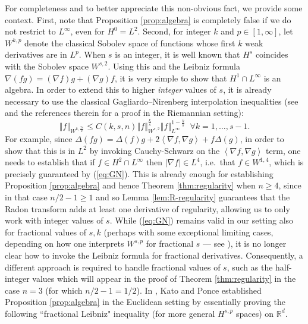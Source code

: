 \documentclass[11pt]{article}
\theoremstyle{definition}
\theoremstyle{proof}
\DeclareMathOperator{\+}{\mathop{\tilde{+}}}
\newcommand{\norm}[1]{\left\Vert#1\right\Vert}
\newcommand{\abs}[1]{\left\vert#1\right\vert}
\newcommand{\scalar}[1]{\left \langle #1 \right \rangle}
\newcommand{\R}{\mathbb{R}}
\numberwithin{equation}{section}
\numberwithin{equation}{section}
\begin{document}
For completeness and to better appreciate this non-obvious fact, we provide some context. First, note that Proposition \ref{prop:algebra} is completely false if we do not restrict to $L^\infty$, even for $H^0 = L^2$.  Second, for integer $k$ and $p \in [1,\infty]$, let $W^{k,p}$ denote the classical Sobolev space of functions whose first $k$ weak derivatives are in $L^p$. When $s$ is an integer, it is well known that $H^s$ coincides with the Sobolev space $W^{s,2}$. Using this and the Leibniz formula $\nabla( f g) = (\nabla f) g + (\nabla g) f$, it is very simple to show that $H^1 \cap L^\infty$ is an algebra. In order to extend this to higher \emph{integer} values of $s$, it is already necessary to use the classical Gagliardo--Nirenberg interpolation inequalities (see \cite[Propositions 31,32]{CoulhonEtAl-SobolevAlgebras} and the references therein for a proof in the Riemannian setting):
\begin{equation} \label{eq:GN}
\norm{f}_{W^{k,\frac{2s}{k}}} \leq C(k,s,n) \norm{f}_{W^{s,2}}^{\frac{k}{s}} \norm{f}_{L^\infty}^{1 - \frac{k}{s}} \;\; \forall k=1,\ldots,s-1 . 
\end{equation}
For example, since $\Delta (f g) = \Delta(f) g + 2 \scalar{\nabla f, \nabla g} + f \Delta(g)$, in order to show that this is in $L^2$ by invoking Cauchy-Schwarz on the $\scalar{\nabla f , \nabla g}$ term, one needs to establish that if $f \in H^2 \cap L^\infty$ then $\abs{\nabla f} \in L^4$, i.e.~that $f \in W^{1,4}$, which is precisely guaranteed by (\ref{eq:GN}). This is already enough for establishing Proposition \ref{prop:algebra} and hence Theorem \ref{thm:regularity} when $n \geq 4$, since in that case $n/2 - 1 \geq 1$ and so Lemma \ref{lem:R-regularity} guarantees that the Radon transform adds at least one derivative of regularity, allowing us to only work with integer values of $s$. While (\ref{eq:GN}) remains valid in our setting also for fractional values of $s,k$ (perhaps with some exceptional limiting cases, depending on how one interprets $W^{s,p}$ for fractional $s$ --- see \cite{BrezisMironescu-TheFullStory,CoulhonEtAl-SobolevAlgebras}),
it is no longer clear how to invoke the Leibniz formula for fractional derivatives. Consequently, a different approach is required to handle fractional values of $s$, such as the half-integer values which will appear in the proof of Theorem \ref{thm:regularity} in the case $n=3$ (for which $n/2  - 1 = 1/2$). 
In \cite[Appendix]{KatoPonce-Commutators}, Kato and Ponce established Proposition \ref{prop:algebra} in the Euclidean setting by essentially proving the following ``fractional Leibniz" inequality (for more general $H^{s,p}$ spaces) on $\R^d$.
\end{document}
